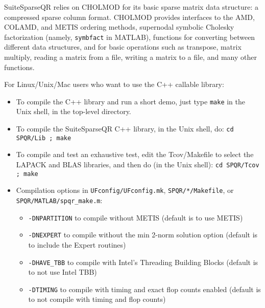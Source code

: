 \documentclass[12pt]{article}
\begin{document}
SuiteSparseQR relies on CHOLMOD for its basic sparse matrix data structure: a
compressed sparse column format.  CHOLMOD provides interfaces to the AMD,
COLAMD, and METIS ordering methods, supernodal symbolic Cholesky factorization
(namely, \verb'symbfact' in MATLAB), functions for converting between different
data structures, and for basic operations such as transpose, matrix multiply,
reading a matrix from a file, writing a matrix to a file, and many other
functions.

For Linux/Unix/Mac users who want to use the C++ callable library:

\begin{itemize}
\item
    To compile the C++ library and run a short demo, just type \verb'make' in
        the Unix shell, in the top-level directory.

\item
    To compile the SuiteSparseQR C++ library, in the Unix shell, do:
        \verb'cd SPQR/Lib ; make'

\item
    To compile and test an exhaustive test, edit the Tcov/Makefile to select
    the LAPACK and BLAS libraries, and then do (in the Unix shell):
        \verb'cd SPQR/Tcov ; make'

\item
    Compilation options in \verb'UFconfig/UFconfig.mk', \verb'SPQR/*/Makefile',
    or \\ \verb'SPQR/MATLAB/spqr_make.m':

    \begin{itemize}
    \item
        \verb'-DNPARTITION'  to compile without METIS (default is to use METIS)

    \item
        \verb'-DNEXPERT'
            to compile without the min 2-norm solution option
                        (default is to include the Expert routines)

    \item
        \verb'-DHAVE_TBB'
            to compile with Intel's Threading Building Blocks
                        (default is to not use Intel TBB)

    \item
        \verb'-DTIMING' 
            to compile with timing and exact flop counts enabled
                        (default is to not compile with timing and flop counts)
    \end{itemize}
\end{itemize}
\end{document}
